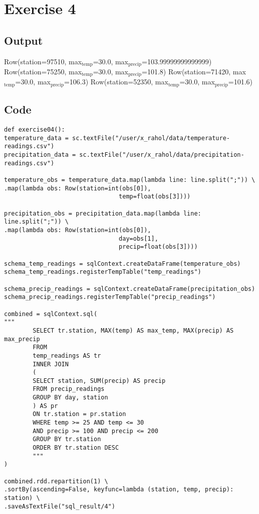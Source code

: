 \documentclass[10pt]{article}
\begin{document}
\section*{Exercise 4}
\label{sec-4}
\subsection*{Output}
\label{sec-4-1}
Row(station=97510, max$_{\text{temp}}$=30.0, max$_{\text{precip}}$=103.99999999999999)
Row(station=75250, max$_{\text{temp}}$=30.0, max$_{\text{precip}}$=101.8)
Row(station=71420, max$_{\text{temp}}$=30.0, max$_{\text{precip}}$=106.3)
Row(station=52350, max$_{\text{temp}}$=30.0, max$_{\text{precip}}$=101.6)
\newline
\subsection*{Code}
\label{sec-4-2}
\begin{verbatim}
def exercise04():
temperature_data = sc.textFile("/user/x_rahol/data/temperature-readings.csv")
precipitation_data = sc.textFile("/user/x_rahol/data/precipitation-readings.csv")

temperature_obs = temperature_data.map(lambda line: line.split(";")) \
.map(lambda obs: Row(station=int(obs[0]),
                                temp=float(obs[3])))

precipitation_obs = precipitation_data.map(lambda line: line.split(";")) \
.map(lambda obs: Row(station=int(obs[0]),
                                day=obs[1],
                                precip=float(obs[3])))

schema_temp_readings = sqlContext.createDataFrame(temperature_obs)
schema_temp_readings.registerTempTable("temp_readings")

schema_precip_readings = sqlContext.createDataFrame(precipitation_obs)
schema_precip_readings.registerTempTable("precip_readings")

combined = sqlContext.sql(
"""
        SELECT tr.station, MAX(temp) AS max_temp, MAX(precip) AS max_precip
        FROM
        temp_readings AS tr
        INNER JOIN
        (
        SELECT station, SUM(precip) AS precip
        FROM precip_readings
        GROUP BY day, station
        ) AS pr
        ON tr.station = pr.station
        WHERE temp >= 25 AND temp <= 30
        AND precip >= 100 AND precip <= 200
        GROUP BY tr.station
        ORDER BY tr.station DESC
        """
)

combined.rdd.repartition(1) \
.sortBy(ascending=False, keyfunc=lambda (station, temp, precip): station) \
.saveAsTextFile("sql_result/4")
\end{verbatim}
\newpage
\end{document}

